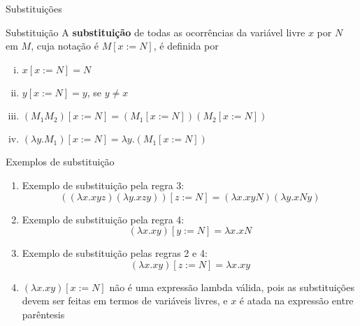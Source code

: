 \begin{frame}[fragile]{Substituições}

    \begin{block}{Substituição}
    A \textbf{substituição} de todas as ocorrências da variável livre $x$ por $N$ em $M$, cuja
    notação é $M[x:=N]$, é definida por
    \begin{enumerate}[i.]
        \item $x[x:=N] = N$
        \item $y[x:=N] = y$, se $y\neq x$
        \item $(M_1M_2)[x:=N] = (M_1[x:=N])(M_2[x:=N])$
        \item $(\lambda y.M_1)[x:=N] = \lambda y.(M_1[x:=N])$
    \end{enumerate}
    \end{block}

\end{frame}

\begin{frame}[fragile]{Exemplos de substituição}

    \begin{enumerate}
        \item Exemplo de substituição pela regra 3:
        \[
            ((\lambda x.xyz)(\lambda y.xzy))[z:=N] = (\lambda x.xyN)(\lambda y.xNy) 
        \]

        \item Exemplo de substituição pela regra 4:
        \[
            (\lambda x.xy)[y:=N] = \lambda x.xN
        \]

        \item Exemplo de substituição pelas regras 2 e 4:
        \[
            (\lambda x.xy)[z:=N] = \lambda x.xy
        \]

        \item $(\lambda x.xy)[x:=N]$ não é uma expressão lambda válida, pois as substituições
            devem ser feitas em termos de variáveis livres, e $x$ é atada na expressão entre
            parêntesis
    \end{enumerate}

\end{frame}

